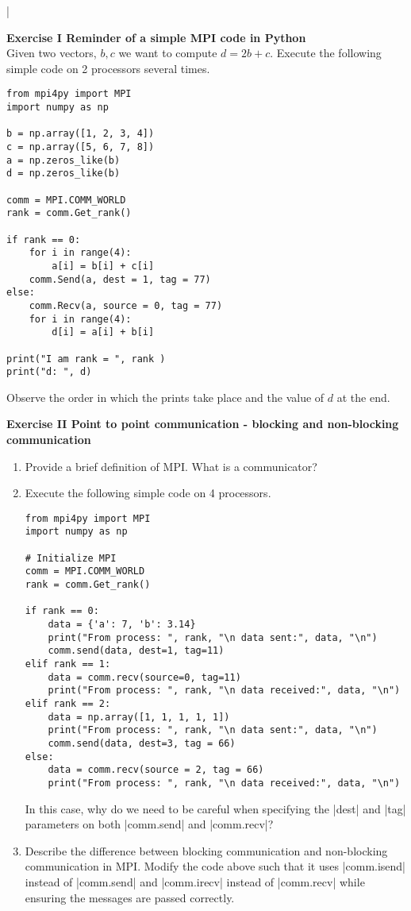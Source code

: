 \documentclass[11pt]{article}
\begin{document}
\lstset{frameround=fttt,language=Matlab}

\lstMakeShortInline[columns=fixed]|


{\bf{Exercise I Reminder of a simple MPI code in Python}}\\

Given two vectors, $b, c$ we want to compute $d = 2b + c$. Execute the following simple code on 2 processors several times. 

\begin{verbatim}
from mpi4py import MPI 
import numpy as np  

b = np.array([1, 2, 3, 4])
c = np.array([5, 6, 7, 8])
a = np.zeros_like(b)
d = np.zeros_like(b)

comm = MPI.COMM_WORLD
rank = comm.Get_rank()

if rank == 0:
    for i in range(4):
        a[i] = b[i] + c[i]
    comm.Send(a, dest = 1, tag = 77)
else:
    comm.Recv(a, source = 0, tag = 77)
    for i in range(4):
        d[i] = a[i] + b[i]

print("I am rank = ", rank )
print("d: ", d)
\end{verbatim}

Observe the order in which the prints take place and the value of $d$ at the end. \\

\bigskip

{\bf{Exercise II Point to point communication - blocking and non-blocking communication}}\\

\begin{enumerate}
    \item Provide a brief definition of MPI. What is a communicator?
    \item Execute the following simple code on 4 processors.
    \begin{verbatim}
from mpi4py import MPI
import numpy as np

# Initialize MPI
comm = MPI.COMM_WORLD
rank = comm.Get_rank()

if rank == 0:
    data = {'a': 7, 'b': 3.14}
    print("From process: ", rank, "\n data sent:", data, "\n")
    comm.send(data, dest=1, tag=11)
elif rank == 1:
    data = comm.recv(source=0, tag=11)
    print("From process: ", rank, "\n data received:", data, "\n")
elif rank == 2:
    data = np.array([1, 1, 1, 1, 1])
    print("From process: ", rank, "\n data sent:", data, "\n")
    comm.send(data, dest=3, tag = 66)
else:
    data = comm.recv(source = 2, tag = 66)
    print("From process: ", rank, "\n data received:", data, "\n")
    \end{verbatim}
    In this case, why do we need to be careful when specifying the |dest| and |tag| parameters on both |comm.send| and |comm.recv|?
    \item Describe the difference between blocking communication and non-blocking communication in MPI. Modify the code above such that it uses |comm.isend| instead of |comm.send| and |comm.irecv| instead of |comm.recv| while ensuring the messages are passed correctly. 
\end{enumerate}
\end{document}
